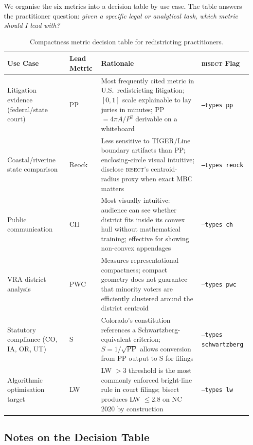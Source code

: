 We organise the six metrics into a decision table by use case.
The table answers the practitioner question: \emph{given a specific legal or
analytical task, which metric should I lead with?}

\begin{table}[ht]
\centering
\caption{Compactness metric decision table for redistricting practitioners.}
\label{tab:decision}
\begin{tabular}{p{3.0cm}p{2.2cm}p{5.5cm}p{3.0cm}}
\toprule
Use Case & Lead Metric & Rationale & \textsc{bisect} Flag \\
\midrule
Litigation evidence (federal/state court) &
  PP &
  Most frequently cited metric in U.S.\ redistricting litigation; $[0,1]$ scale
  explainable to lay juries in minutes; PP $= 4\pi A/P^2$ derivable on a whiteboard &
  \texttt{--types pp} \\
\addlinespace
Coastal/riverine state comparison &
  Reock &
  Less sensitive to TIGER/Line boundary artifacts than PP; enclosing-circle visual
  intuitive; disclose \textsc{bisect}'s centroid-radius proxy when exact MBC matters &
  \texttt{--types reock} \\
\addlinespace
Public communication &
  CH &
  Most visually intuitive: audience can see whether district fits inside its convex
  hull without mathematical training; effective for showing non-convex appendages &
  \texttt{--types ch} \\
\addlinespace
VRA district analysis &
  PWC &
  Measures representational compactness; compact geometry does not guarantee
  that minority voters are efficiently clustered around the district centroid &
  \texttt{--types pwc} \\
\addlinespace
Statutory compliance (CO, IA, OR, UT) &
  S &
  Colorado's constitution references a Schwartzberg-equivalent criterion;
  $S = 1/\sqrt{\text{PP}}$ allows conversion from PP output to S for filings &
  \texttt{--types schwartzberg} \\
\addlinespace
Algorithmic optimisation target &
  LW &
  LW $>3$ threshold is the most commonly enforced bright-line rule in court
  filings; bisect produces LW $\leq 2.8$ on NC 2020 by construction &
  \texttt{--types lw} \\
\bottomrule
\end{tabular}
\end{table}

\subsection{Notes on the Decision Table}

